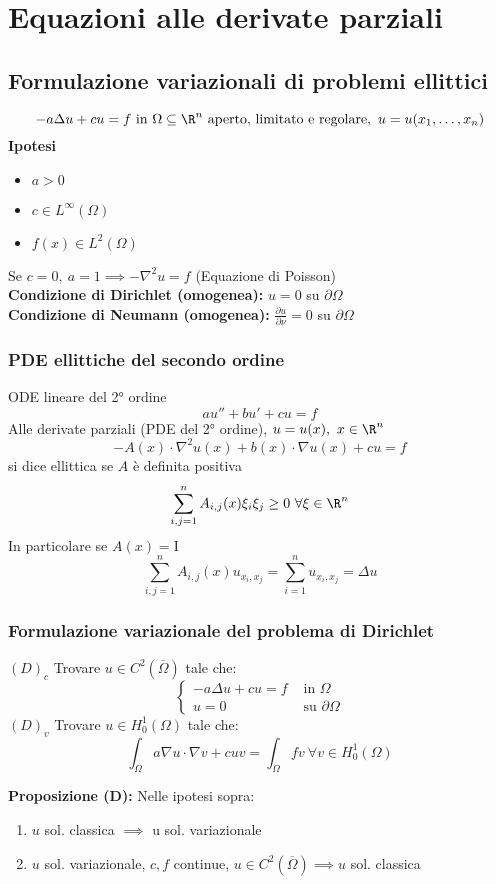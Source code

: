

\section{Equazioni alle derivate parziali}
\subsection{Formulazione variazionali di problemi ellittici}
\[-a\Delta u+cu=f\text{ in }\Omega\subseteq  \R^n\text{ aperto, limitato e regolare},\ u=u(x_1,\ldots,x_n)\]
\textbf{Ipotesi}
\begin{itemize}
	\item $a>0$ 
	\item $c\in L^{\infty}(\Omega)$ 
	\item $f(x)\in L^{2}(\Omega)$
\end{itemize}
Se $c=0,\ a=1\implies -\nabla ^2 u=f$ (Equazione di Poisson)\\
\textbf{Condizione di Dirichlet (omogenea):} $u=0$ su $\partial\Omega$
\\\textbf{Condizione di Neumann (omogenea):} $\frac{\partial u}{\partial \nu} =0$ su $\partial\Omega$
\subsubsection{PDE ellittiche del secondo ordine}
ODE lineare del 2° ordine
\[au''+bu'+cu=f\]
Alle derivate parziali (PDE del 2° ordine), $u=u(x),\ x\in \R^n$
\[-A(x)\cdot \nabla ^2 u(x)+b(x)\cdot \nabla u(x)+cu=f\]
si dice ellittica se $A$ è definita positiva
\[\sum_{i,j=1}^{n} A_{i,j}(x)\xi_i\xi_j\ge 0\ \forall \xi \in \R^n\]
In particolare se $A(x)=\text{I}$ 
\[\sum_{i,j=1}^{n} A_{i,j}(x)u_{x_i,x_j}=\sum_{i=1}^{n} u_{x_i,x_j}=\Delta u\]
\subsubsection{Formulazione variazionale del problema di Dirichlet}
$(D)_c$ Trovare $u\in C^2(\overline\Omega)$ tale che:
\[\begin{cases}
	-a\Delta u+cu=f&\text{ in }\Omega
	\\u=0&\text{ su }\partial \Omega
\end{cases}\]
$(D)_v$ Trovare $u\in H_0^1(\Omega)$ tale che:
\[\int_{\Omega}^{} a\nabla u\cdot \nabla v+cuv=\int_{\Omega}^{}fv \ \forall v\in H_0^1(\Omega)\]
\begin{tcolorbox}
	\textbf{Proposizione (D):} Nelle ipotesi sopra:
	\begin{enumerate}
		\item $u$ sol. classica $\implies $ u sol. variazionale
		\item $u$ sol. variazionale, $c,f$ continue, $u\in C^2(\overline\Omega)\implies u$ sol. classica
	\end{enumerate}
\end{tcolorbox}

